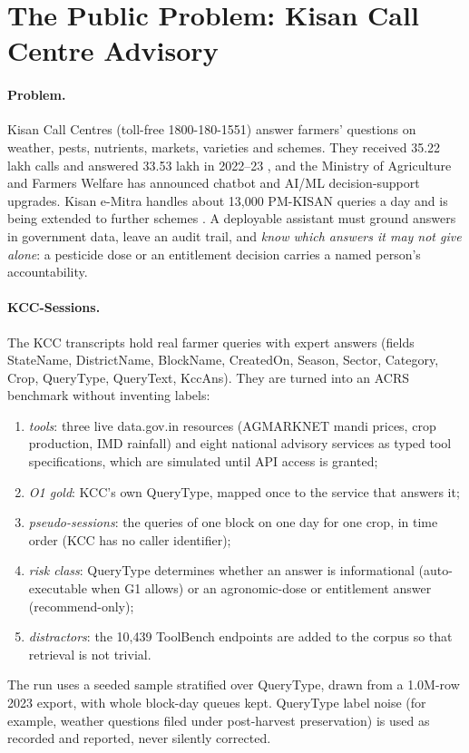 \section{The Public Problem: Kisan Call Centre Advisory}
\label{sec:gov-kcc}

\paragraph{Problem.} Kisan Call Centres (toll-free 1800-180-1551) answer farmers' questions on weather,
pests, nutrients, markets, varieties and schemes. They received 35.22 lakh calls and answered 33.53
lakh in 2022--23 \citep{loksabha2023kcc}, and the Ministry of Agriculture and Farmers Welfare has
announced chatbot and AI/ML decision-support upgrades. Kisan e-Mitra handles about 13{,}000 PM-KISAN
queries a day and is being extended to further schemes \citep{wadhwani2024kisanemitra}. A deployable
assistant must ground answers in government data, leave an audit trail, and \emph{know which answers it
may not give alone}: a pesticide dose or an entitlement decision carries a named person's
accountability.

\paragraph{KCC-Sessions.} The KCC transcripts \citep{kccchakshu} hold real farmer queries with expert
answers (fields StateName, DistrictName, BlockName, CreatedOn, Season, Sector, Category, Crop,
QueryType, QueryText, KccAns). They are turned into an ACRS benchmark without inventing labels:
\begin{enumerate}
  \item \emph{tools}: three live data.gov.in resources (AGMARKNET mandi prices, crop production, IMD
        rainfall) and eight national advisory services as typed tool specifications, which are
        simulated until API access is granted;
  \item \emph{O1 gold}: KCC's own QueryType, mapped once to the service that answers it;
  \item \emph{pseudo-sessions}: the queries of one block on one day for one crop, in time order (KCC
        has no caller identifier);
  \item \emph{risk class}: QueryType determines whether an answer is informational (auto-executable
        when G1 allows) or an agronomic-dose or entitlement answer (recommend-only);
  \item \emph{distractors}: the 10{,}439 ToolBench endpoints are added to the corpus so that retrieval
        is not trivial.
\end{enumerate}
The run uses a seeded sample stratified over QueryType, drawn from a 1.0M-row 2023 export, with whole
block-day queues kept. QueryType label noise (for example, weather questions filed under post-harvest
preservation) is used as recorded and reported, never silently corrected.

